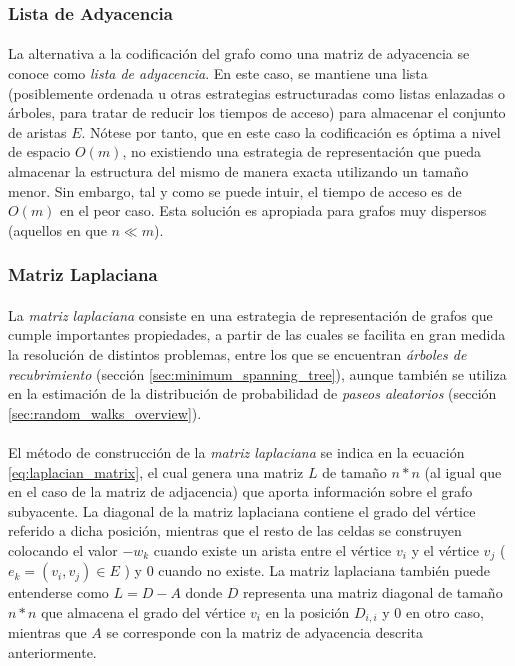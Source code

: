 \documentclass{subfiles}
\begin{document}
        \subsubsection{Lista de Adyacencia}
        \label{sec:adjacency_list}

          \paragraph{}
          La alternativa a la codificación del grafo como una matriz de adyacencia se conoce como \emph{lista de adyacencia}. En este caso, se mantiene una lista (posiblemente ordenada u otras estrategias estructuradas como listas enlazadas o árboles, para tratar de reducir los tiempos de acceso) para almacenar el conjunto de aristas $E$. Nótese por tanto, que en este caso la codificación es óptima a nivel de espacio $O(m)$, no existiendo una estrategia de representación que pueda almacenar la estructura del mismo de manera exacta utilizando un tamaño menor. Sin embargo, tal y como se puede intuir, el tiempo de acceso es de $O(m)$ en el peor caso. Esta solución es apropiada para grafos muy dispersos (aquellos en que $n \ll m$).

        \subsubsection{Matriz Laplaciana}
        \label{sec:laplacian_matrix}

          \paragraph{}
          La \emph{matriz laplaciana} consiste en una estrategia de representación de grafos que cumple importantes propiedades, a partir de las cuales se facilita en gran medida la resolución de distintos problemas, entre los que se encuentran \emph{árboles de recubrimiento} (sección \ref{sec:minimum_spanning_tree}), aunque también se utiliza en la estimación de la distribución de probabilidad de \emph{paseos aleatorios} (sección \ref{sec:random_walks_overview}).

          \paragraph{}
          El método de construcción de la \emph{matriz laplaciana} se indica en la ecuación \eqref{eq:laplacian_matrix}, el cual genera una matriz $L$ de tamaño $n * n$ (al igual que en el caso de la matriz de adjacencia) que aporta información sobre el grafo subyacente. La diagonal de la matriz laplaciana contiene el grado del vértice referido a dicha posición, mientras que el resto de las celdas se construyen colocando el valor $-w_k$ cuando existe un arista entre el vértice $v_i$ y el vértice $v_j$ ( $e_k = (v_i,v_j) \in E$ ) y $0$ cuando no existe. La matriz laplaciana también puede entenderse como $L = D - A$ donde $D$ representa una matriz diagonal de tamaño $n*n$ que almacena el grado del vértice $v_i$ en la posición $D_{i,i}$ y $0$ en otro caso, mientras que $A$ se corresponde con la matriz de adyacencia descrita anteriormente.
\end{document}

